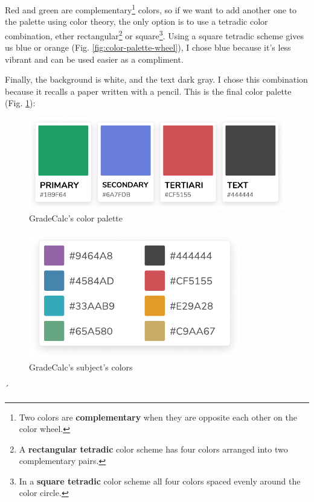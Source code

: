 Red and green are complementary\footnote{Two colors are \textbf{complementary} when they are opposite each other on the color wheel.} colors, so if we want to add another one to the palette using color theory\cite{color-harmonies}, the only option is to use a tetradic color combination, ether rectangular\footnote{A \textbf{rectangular tetradic} color scheme has four colors arranged into two complementary pairs.} or square\footnote{In a \textbf{square tetradic} color scheme all four colors spaced evenly around the color circle.}. Using a square tetradic scheme gives us blue or orange (Fig. \ref{fig:color-palette-wheel}), I chose blue because it's less vibrant and can be used easier as a compliment.

Finally, the background is white, and the text dark gray. I chose this combination because it recalls a paper written with a pencil. This is the final color palette (Fig. \ref{fig:color-palette}):

\vfill
\begin{figure}[ht!]
    \center
    \vspace*{-0.25in}
    \includegraphics[scale=1.25]{media/color-palette.pdf}
    \vspace*{-0.125in}
    \caption{GradeCalc's color palette}
    \label{fig:color-palette}
\end{figure}
\vfill
\begin{figure}[ht!]
    \center
    \vspace*{-0.5in}
    \includegraphics[scale=1.25]{media/color-palete-subjects.pdf}
    \vspace*{-0.125in}
    \caption{GradeCalc's subject's colors}
    \label{fig:color-palette-subjects}
\end{figure}
\vspace*{-0.5in}´
\vfill

